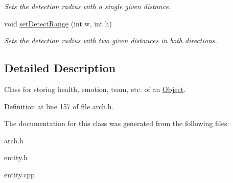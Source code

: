 \begin{DoxyCompactItemize}
\begin{DoxyCompactList}\small\item\em Sets the detection radius with a single given distance. \end{DoxyCompactList}\item 
void \hyperlink{classEntity_af4b91451301036e4aed029e90a7ba726}{set\+Detect\+Range} (int w, int h)\hypertarget{classEntity_af4b91451301036e4aed029e90a7ba726}{}\label{classEntity_af4b91451301036e4aed029e90a7ba726}

\begin{DoxyCompactList}\small\item\em Sets the detection radius with two given distances in both directions. \end{DoxyCompactList}\end{DoxyCompactItemize}


\subsection{Detailed Description}
Class for storing health, emotion, team, etc. of an \hyperlink{classObject}{Object}. 

Definition at line 157 of file arch.\+h.



The documentation for this class was generated from the following files\+:\begin{DoxyCompactItemize}
\item 
arch.\+h\item 
entity.\+h\item 
entity.\+cpp\end{DoxyCompactItemize}
